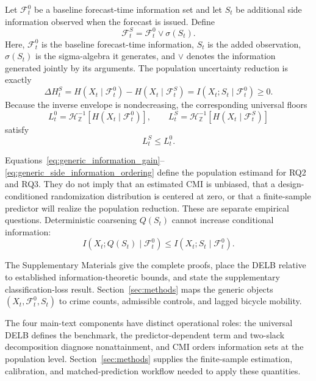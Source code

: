\documentclass[applsci,article,accept,moreauthors]{Definitions/mdpi}
\begin{document}
Let \(\mathcal F_t^0\) be a baseline forecast-time information set and let \(S_t\)
be additional side information observed when the forecast is issued. Define
\begin{equation}
\mathcal F_t^S=\mathcal F_t^0\vee\sigma(S_t).
\label{eq:generic_augmented_information}
\end{equation}
{Here, \(\mathcal F_t^0\) is the baseline forecast-time information,
\(S_t\) is the added observation, \(\sigma(S_t)\) is the sigma-algebra it
generates, and \(\vee\) denotes the information generated jointly by its
arguments.}
The population uncertainty reduction is exactly
\begin{equation}
\Delta H^S_t
=
H(X_t\mid\mathcal F_t^0)-H(X_t\mid\mathcal F_t^S)
=
I(X_t;S_t\mid\mathcal F_t^0)\geq0.
\label{eq:generic_information_gain}
\end{equation}
Because the inverse envelope is nondecreasing, the corresponding universal floors
\begin{equation}
L_t^0=\mathcal H_{\mathbb Z}^{-1}
\!\left[H(X_t\mid\mathcal F_t^0)\right],
\qquad
L_t^S=\mathcal H_{\mathbb Z}^{-1}
\!\left[H(X_t\mid\mathcal F_t^S)\right]
\label{eq:generic_side_information_bounds}
\end{equation}
satisfy
\begin{equation}
L_t^S\leq L_t^0.
\label{eq:generic_side_information_ordering}
\end{equation}

Equations~\eqref{eq:generic_information_gain}--\eqref{eq:generic_side_information_ordering} define the population estimand
for RQ2 and RQ3. They do not imply that an estimated CMI is
unbiased, that a design-conditioned randomization distribution is centered
at zero, or that a finite-sample predictor will realize the population
reduction. These are separate empirical questions. Deterministic
coarsening \(Q(S_t)\) cannot increase conditional information:
\begin{equation}
I(X_t;Q(S_t)\mid\mathcal F_t^0)
\leq
I(X_t;S_t\mid\mathcal F_t^0).
\label{eq:generic_data_processing}
\end{equation}

The Supplementary Materials give the complete proofs, place the DELB relative
to established information-theoretic bounds, and state the supplementary
classification-loss result. Section~\ref{sec:methods} maps the generic objects
\((X_t,\mathcal F_t^0,S_t)\) to crime counts, admissible controls, and lagged
bicycle mobility.

The four main-text components have distinct operational roles: the universal
DELB defines the benchmark, the predictor-dependent term and two-slack
decomposition diagnose nonattainment, and CMI orders information sets at the
population level. Section~\ref{sec:methods} supplies the finite-sample
estimation, calibration, and matched-prediction workflow needed to apply
these quantities.
\end{document}
